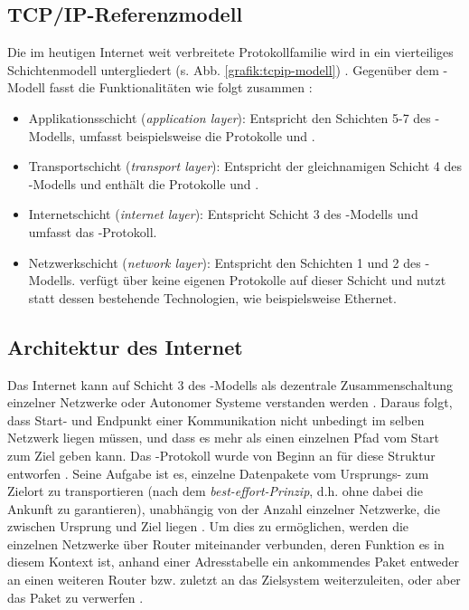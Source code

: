 \subsection{TCP/IP-Referenzmodell}\label{sec:TCP/IP}
Die im heutigen Internet weit verbreitete Protokollfamilie  wird in ein vierteiliges Schichtenmodell untergliedert (s. Abb. \ref{grafik:tcpip-modell}) \autocite[Vgl.][46]{Tanenbaum2010}. Gegenüber dem -Modell fasst \citeauthor{Holtkamp2002} die Funktionalitäten wie folgt zusammen \autocite[Vgl.][12\psq]{Holtkamp2002}:
\begin{itemize}
\item Applikationsschicht (\textit{application layer}): Entspricht den Schichten 5-7 des -Modells, umfasst beispielsweise die Protokolle  und .
\item Transportschicht (\textit{transport layer}): Entspricht der gleichnamigen Schicht 4 des -Modells und enthält die Protokolle  und .
\item Internetschicht (\textit{internet layer}): Entspricht Schicht 3 des -Modells und umfasst das -Protokoll.
\item Netzwerkschicht (\textit{network layer}): Entspricht den Schichten 1 und 2 des -Modells.  verfügt über keine eigenen Protokolle auf dieser Schicht und nutzt statt dessen bestehende Technologien, wie beispielsweise Ethernet.
\end{itemize}

\subsection{Architektur des Internet} \label{sec:IP}
Das Internet kann auf Schicht 3 des -Modells als dezentrale Zusammenschaltung einzelner Netzwerke oder Autonomer Systeme verstanden werden \autocite[Vgl.][437]{Tanenbaum2010}. Daraus folgt, dass Start- und Endpunkt einer Kommunikation nicht unbedingt im selben Netzwerk liegen müssen, und dass es mehr als einen einzelnen Pfad vom Start zum Ziel geben kann. Das -Protokoll wurde von Beginn an für diese Struktur entworfen \autocite[Vgl.][438]{Tanenbaum2010}. Seine Aufgabe ist es, einzelne Datenpakete vom Ursprungs- zum Zielort zu transportieren (nach dem \textit{best-effort-Prinzip}, d.h. ohne dabei die Ankunft zu garantieren), unabhängig von der Anzahl einzelner Netzwerke, die zwischen Ursprung und Ziel liegen \autocite[Vgl.][438]{Tanenbaum2010}. Um dies zu ermöglichen, werden die einzelnen Netzwerke über Router miteinander verbunden, deren Funktion es in diesem Kontext ist, anhand einer Adresstabelle ein ankommendes Paket entweder an einen weiteren Router bzw. zuletzt an das Zielsystem weiterzuleiten, oder aber das Paket zu verwerfen \autocite[Vgl.][342]{Tanenbaum2010}.

